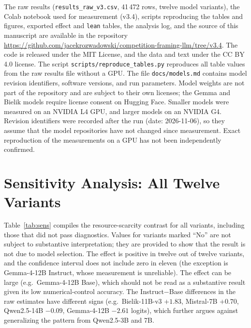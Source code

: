 \documentclass[11pt]{article}
\begin{document}
The raw results (\texttt{results\_raw\_v3.csv}, 41\,472 rows, twelve model variants), the Colab notebook used for measurement (v3.4), scripts reproducing the tables and figures, exported effect and \texttt{lean} tables, the analysis log, and the source of this manuscript are available in the repository \url{https://github.com/jacekrozwadowski/competition-framing-llm/tree/v3.4}. The code is released under the MIT License, and the data and text under the CC BY 4.0 license. The script \texttt{scripts/reproduce\_tables.py} reproduces all table values from the raw results file without a GPU. The file \texttt{docs/models.md} contains model revision identifiers, software versions, and run parameters. Model weights are not part of the repository and are subject to their own licenses; the Gemma and Bielik models require license consent on Hugging Face. Smaller models were measured on an NVIDIA L4 GPU, and larger models on an NVIDIA G4. Revision identifiers were recorded after the run (date: 2026-11-06), so they assume that the model repositories have not changed since measurement. Exact reproduction of the measurements on a GPU has not been independently confirmed.

\appendix
\section{Sensitivity Analysis: All Twelve Variants}\label{app:sens}
Table~\ref{tab:sens} compiles the resource-scarcity contrast for all variants, including those that did not pass diagnostics. Values for variants marked ``No'' are not subject to substantive interpretation; they are provided to show that the result is not due to model selection. The effect is positive in twelve out of twelve variants, and the confidence interval does not include zero in eleven (the exception is Gemma-4-12B Instruct, whose measurement is unreliable). The effect can be large (e.g.\ Gemma-4-12B Base), which should not be read as a substantive result given its low numerical-control accuracy. The Instruct$-$Base differences in the raw estimates have different signs (e.g.\ Bielik-11B-v3 $+1.83$, Mistral-7B $+0.70$, Qwen2.5-14B $-0.09$, Gemma-4-12B $-2.61$ logits), which further argues against generalizing the pattern from Qwen2.5-3B and 7B.
\end{document}
